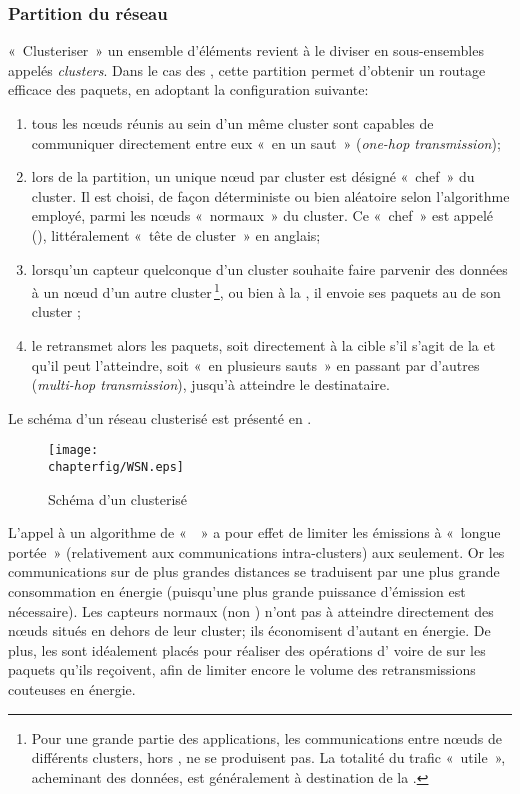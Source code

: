         \subsubsection{Partition du réseau}
«~Clusteriser~» un ensemble d'éléments revient à le diviser en sous-ensembles appelés \textit{clusters}.
Dans le cas des \rcsfs, cette partition permet d'obtenir un routage efficace des paquets, en adoptant la configuration suivante:
\begin{enumerate}
    \item tous les nœuds réunis au sein d'un même cluster sont capables de communiquer directement entre eux « en un saut » (\textit{one-hop transmission});
    \item lors de la partition, un unique nœud par cluster est désigné «~chef~» du cluster.
        Il est choisi, de façon déterministe ou bien aléatoire selon l'algorithme employé, parmi les nœuds «~normaux~» du cluster.
        Ce «~chef~» est appelé \textit{\ch} (\CH), littéralement « tête de cluster » en anglais;
    \item lorsqu'un capteur quelconque d'un cluster souhaite faire parvenir des données à un nœud d'un autre cluster\,\footnote{Pour une grande partie des applications, les communications entre nœuds de différents clusters, hors \chs, ne se produisent pas. La totalité du trafic «~utile~», acheminant des données, est généralement à destination de la \sdb.}, ou bien à la \sdb, il envoie ses paquets au \ch de son cluster ;
    \item le \ch retransmet alors les paquets, soit directement à la cible s'il s'agit de la \sdb et qu'il peut l'atteindre, soit « en plusieurs sauts » en passant par d'autres \chs (\textit{multi-hop transmission}), jusqu'à atteindre le destinataire.
\end{enumerate}
Le schéma d'un réseau clusterisé est présenté en .
\begin{figure}[!ht]
    \centering
    \texttt{[image: \\chapterfig/WSN.eps]}
    \caption{Schéma d'un \rc clusterisé}\label{st:fig:wsn}
\end{figure}

L'appel à un algorithme de «  » a pour effet de limiter les émissions à «~longue portée~» (relativement aux communications intra-clusters) aux \chs seulement.
Or les communications sur de plus grandes distances se traduisent par une plus grande consommation en énergie (puisqu'une plus grande puissance d'émission est nécessaire).
Les capteurs normaux (non \chs) n'ont pas à atteindre directement des nœuds situés en dehors de leur cluster; ils économisent d'autant en énergie.
De plus, les \chs sont idéalement placés pour réaliser des opérations d' voire de  sur les paquets qu'ils reçoivent, afin de limiter encore le volume des retransmissions couteuses en énergie.

